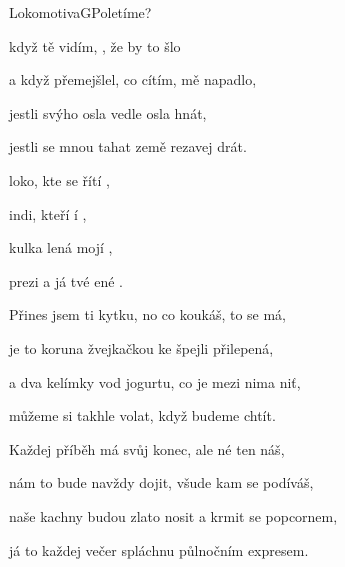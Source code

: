\setcounter{page}{48}
\begin{song}{Lokomotiva}{G}{Poletíme?}

\begin{SBVerse}

 když tě vidím, , že by to šlo

a když  přemejšlel, co cítím,  mě napadlo,

jestli  svýho osla vedle  osla hnát,

jestli  se mnou tahat země rezavej drát.

\end{SBVerse}

\begin{SBChorus}

 loko, kte se řítí ,

 indi, kteří í ,

 kulka lená mojí ,

 prezi a já tvé ené .

\end{SBChorus}

\begin{SBVerse}

Přines jsem ti kytku, no co koukáš, to se má,

je to koruna žvejkačkou ke špejli přilepená,

a dva kelímky vod jogurtu, co je mezi nima niť,

můžeme si takhle volat, když budeme chtít.

\end{SBVerse}

\begin{SBChorus}

\end{SBChorus}

\begin{SBVerse}

Každej příběh má svůj konec, ale né ten náš,

nám to bude navždy dojit, všude kam se podíváš,

naše kachny budou zlato nosit a krmit se popcornem,

já to každej večer spláchnu půlnočním expresem.

\end{SBVerse}


\end{song}
